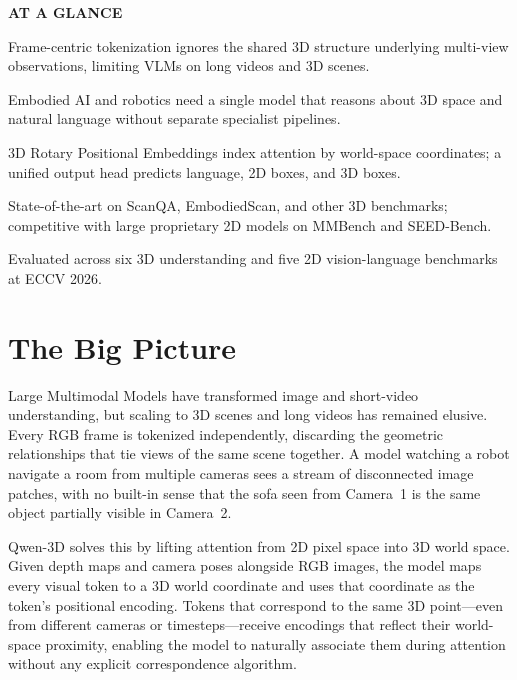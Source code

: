 \documentclass[10pt,twocolumn]{article}
\begin{document}
\begin{mdframed}[backgroundcolor=boxgray,linecolor=rulered,linewidth=1pt,
    innerleftmargin=6pt,innerrightmargin=6pt,
    innertopmargin=6pt,innerbottommargin=6pt]
\textbf{\small AT A GLANCE}\par\vspace{4pt}
\begin{description}[leftmargin=0pt,labelsep=4pt,itemsep=2pt,parsep=0pt,
    font=\small\bfseries]
  \item[Problem:] Frame-centric tokenization ignores the shared 3D structure
    underlying multi-view observations, limiting VLMs on long videos and 3D scenes.
  \item[Why it matters:] Embodied AI and robotics need a single model that
    reasons about 3D space and natural language without separate specialist pipelines.
  \item[Method:] 3D Rotary Positional Embeddings index attention by world-space
    coordinates; a unified output head predicts language, 2D boxes, and 3D boxes.
  \item[Result:] State-of-the-art on ScanQA, EmbodiedScan, and other 3D benchmarks;
    competitive with large proprietary 2D models on MMBench and SEED-Bench.
  \item[Evidence:] Evaluated across six 3D understanding and five 2D vision-language
    benchmarks at ECCV 2026.
\end{description}
\end{mdframed}

\section{The Big Picture}

Large Multimodal Models have transformed image and short-video understanding, but
scaling to 3D scenes and long videos has remained elusive. Every RGB frame is
tokenized independently, discarding the geometric relationships that tie views of the
same scene together. A model watching a robot navigate a room from multiple cameras
sees a stream of disconnected image patches, with no built-in sense that the sofa
seen from Camera~1 is the same object partially visible in Camera~2.

Qwen-3D solves this by lifting attention from 2D pixel space into 3D world space.
Given depth maps and camera poses alongside RGB images, the model maps every visual
token to a 3D world coordinate and uses that coordinate as the token's positional
encoding. Tokens that correspond to the same 3D point---even from different cameras
or timesteps---receive encodings that reflect their world-space proximity, enabling
the model to naturally associate them during attention without any explicit
correspondence algorithm.
\end{document}
